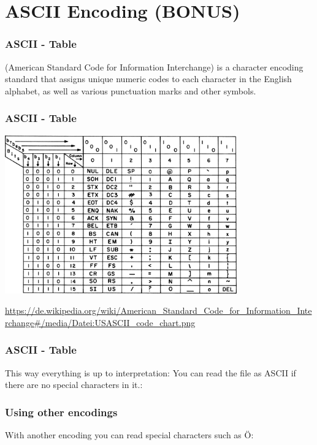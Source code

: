 \documentclass{beamer}
\begin{document}
\section{ASCII Encoding (BONUS)}
\begin{frame}
  \frametitle{ASCII - Table}
     (American Standard Code for Information Interchange) is a character encoding standard that assigns unique numeric codes to each character in the English alphabet, as well as various punctuation marks and other symbols.
\end{frame}
\begin{frame}
  \frametitle{ASCII - Table}
  \begin{center}
    \includegraphics[width=0.75\textwidth]{examples/fig/ASCII.png}
  \end{center}
  \begin{flushleft}
    \vspace{-4mm}
    \tiny\url{https://de.wikipedia.org/wiki/American\_Standard\_Code\_for\_Information\_Interchange\#/media/Datei:USASCII\_code\_chart.png}
  \end{flushleft}
\end{frame}
\begin{frame}
  \frametitle{ASCII - Table}
  This way everything is up to interpretation: 
  You can read the file as ASCII if there are no special characters in it.:
  
\end{frame}
\begin{frame}
  \frametitle{Using other encodings}
  With another encoding you can read special characters such as \glq Ö\grq:
  
\end{frame}
\end{document}

